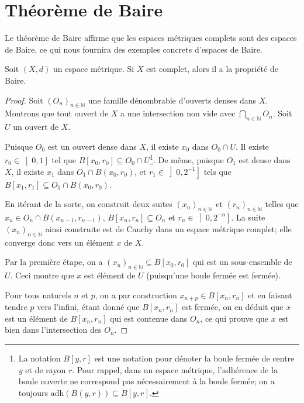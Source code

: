 \section{Théorème de Baire}
Le théorème de Baire affirme que les espaces métriques complets
sont des espaces de Baire, ce qui nous fournira des exemples
concrets d'espaces de Baire.

\begin{thm}
  Soit $(X, d)$ un espace métrique. Si $X$ est complet, alors
  il a la propriété de Baire.
\end{thm}

\begin{proof}
  Soit $(O_n)_{n\in\mathbb{N}}$ une famille dénombrable d'ouverts denses
  dans $X$. Montrons que tout ouvert de $X$ a une intersection non vide
  avec $\bigcap_{n\in\mathbb{N}}O_n$. Soit $U$ un ouvert de $X$.

  Puisque $O_0$ est un ouvert dense dans $X$, il existe $x_0$ dans
  $O_0\cap U$. Il existe $r_0 \in \left]0, 1\right]$ tel
  que $B[x_0, r_0]\subseteq  O_0\cap U$\footnote{La notation
    $B[y, r]$ est une notation pour dénoter la boule
    fermée de centre $y$ et de rayon $r$. Pour rappel, dans un espace
    métrique, l'adhérence de la boule ouverte ne correspond pas nécessairement
    à la boule fermée; on a toujours $\mathrm{adh}(B(y, r))\subseteq B[y, r]$.}.
  De même, puisque $O_1$ est dense dans $X$, il existe $x_1$ dans
  $O_1\cap B(x_0, r_0)$, et $r_1\in\left]0, 2^{-1}\right]$ tels que
  $B[x_1, r_1]\subseteq O_1\cap B(x_0, r_0)$.

  En itérant de la sorte, on construit deux suites $(x_n)_{n\in\mathbb{N}}$
  et $(r_n)_{n\in\mathbb{N}}$ telles que $x_n\in O_n\cap B(x_{n-1}, r_{n-1})$,
  ${B}[x_n, r_n]\subseteq O_n$
  et $r_n\in\left]0, 2 ^{-n}\right]$. La suite $(x_n)_{n\in\mathbb{N}}$ ainsi
  construite est de Cauchy dans un espace métrique complet; elle converge
  donc vers un élément $x$ de $X$.

  Par la première étape, on a $(x_n)_{n\in\mathbb{N}}\subseteq {B}[x_0, r_0]$
  qui est un sous-ensemble de $U$. Ceci montre que $x$ est élément de $U$
  (puisqu'une boule fermée est fermée).

  Pour tous naturels $n$ et $p$, on a par construction $x_{n+p}\in
  {B}[x_n, r_n]$ et en faisant tendre $p$ vers l'infini, étant
  donné que $B[x_n, r_n]$ est fermée, on en déduit que $x$
  est un élément de $B[x_n, r_n]$ qui est contenue dans $O_n$,
  ce qui prouve que $x$ est bien dans l'intersection des $O_n$.
\end{proof}

